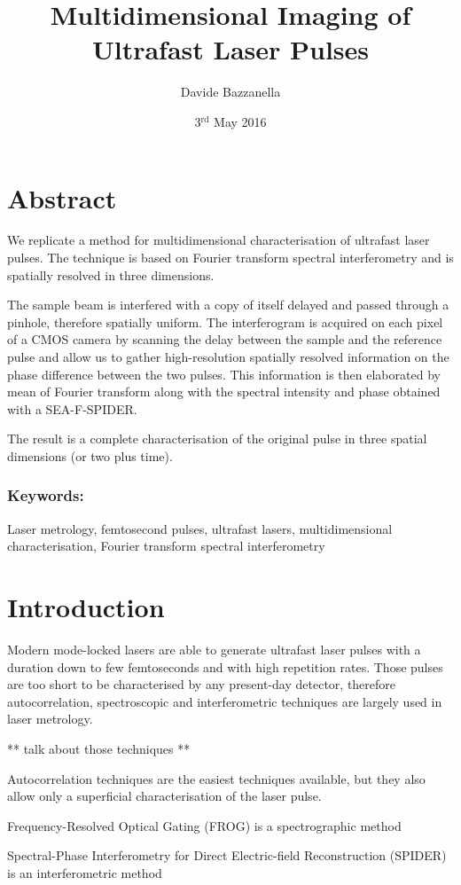 \documentclass[12pt,a4paper,twoside]{article}
\author{Davide Bazzanella}
\title{Multidimensional Imaging of Ultrafast Laser Pulses}
\date{3$^{\mathrm{rd}}$ May 2016}
\begin{document}

\cleardoublepage
\section*{Abstract}
We replicate a method for multidimensional characterisation of ultrafast laser pulses.
The technique is based on Fourier transform spectral interferometry and is spatially resolved in three dimensions.

The sample beam is interfered with a copy of itself delayed and passed through a pinhole, therefore spatially uniform.
The interferogram is acquired on each pixel of a CMOS camera by scanning the delay between the sample and the reference pulse and allow us to gather high-resolution spatially resolved information on the phase difference between the two pulses.
This information is then elaborated by mean of Fourier transform along with the spectral intensity and phase obtained with a SEA-F-SPIDER.

The result is a complete characterisation of the original pulse in three spatial dimensions (or two plus time).
\subsubsection*{Keywords:} Laser metrology, femtosecond pulses, ultrafast lasers, multidimensional characterisation, Fourier transform spectral interferometry
\cleardoublepage
\tableofcontents

\cleardoublepage
{}
\section{Introduction}
Modern mode-locked lasers are able to generate ultrafast laser pulses with a duration down to few femtoseconds \cite{tamura93,schriever14,yu30} and with high repetition rates.
Those pulses are too short to be characterised by any present-day detector, therefore autocorrelation, spectroscopic and interferometric techniques are largely used in laser metrology.

** talk about those techniques **

Autocorrelation techniques are the easiest techniques available, but they also allow only a superficial characterisation of the laser pulse.

Frequency-Resolved Optical Gating (FROG) is a spectrographic method

Spectral-Phase Interferometry for Direct Electric-field Reconstruction (SPIDER) is an interferometric method
\end{document}
